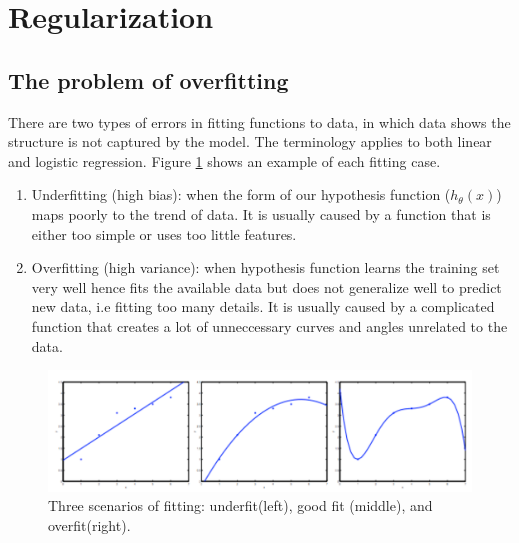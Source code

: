 \section{Regularization}
    \subsection{The problem of overfitting}
    There are two types of errors in fitting functions to data, in which data shows the structure is not captured by the model. The terminology applies to both linear and logistic regression. Figure \ref{fig:fitting} shows an example of each fitting case. 

            \begin{enumerate}
                \item Underfitting (high bias): when the form of our hypothesis function ($h_\theta (x)$) maps poorly to the trend of data. It is usually caused by a function that is either too simple or uses too little features. 
                \item Overfitting (high variance): when hypothesis function learns the training set very well hence fits the available data but does not generalize well to predict new data, i.e fitting too many details. It is usually caused by a complicated function that creates a lot of unneccessary curves and angles unrelated to the data. 
            \end{enumerate}
        
            \begin{figure}[htbp]
                \centering
                \includegraphics{image/fitting.png}
                \caption{Three scenarios of fitting: underfit(left), good fit (middle), and overfit(right).}
                \label{fig:fitting}
            \end{figure}

